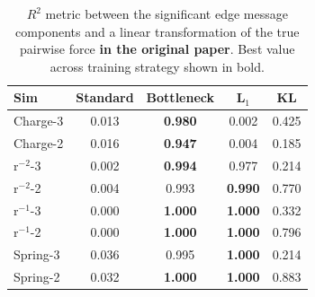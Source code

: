 \documentclass[11pt]{article}
\begin{document}
    \begin{table}[H]
        \centering
        \begin{tabular}{lcccc}
        \hline
        Sim & Standard & Bottleneck & L$_1$ & KL \\
        \hline
        Charge-3 & 0.013 & \textbf{0.980} & 0.002 & 0.425 \\
        Charge-2 & 0.016 & \textbf{0.947} & 0.004 & 0.185 \\
        r$^{-2}$-3 & 0.002 & \textbf{0.994} & 0.977 & 0.214 \\
        r$^{-2}$-2 & 0.004 & 0.993 & \textbf{0.990} & 0.770 \\
        r$^{-1}$-3 & 0.000 & \textbf{1.000} & \textbf{1.000} & 0.332 \\
        r$^{-1}$-2 & 0.000 & \textbf{1.000} & \textbf{1.000} & 0.796 \\
        Spring-3 & 0.036 & 0.995 & \textbf{1.000} & 0.214 \\
        Spring-2 & 0.032 & \textbf{1.000} & \textbf{1.000} & 0.883 \\
        \hline
        \end{tabular}
        \caption{$R^2$ metric between the significant edge message components and a linear transformation of the true pairwise force \textbf{in the original paper}. Best value across training strategy shown in bold.}
        \label{tab:R2_original}
    \end{table}
\end{document}

